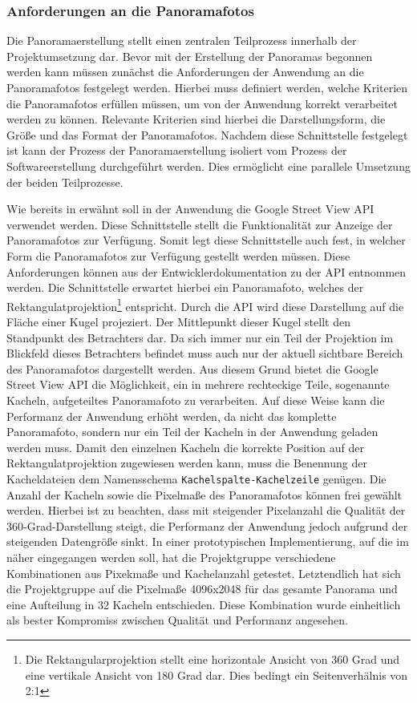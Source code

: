\subsubsection{Anforderungen an die Panoramafotos}
\label{sec:PanoramaerstellungAnforderungen}

Die Panoramaerstellung stellt einen zentralen Teilprozess innerhalb der
Projektumsetzung dar. Bevor mit der Erstellung der Panoramas begonnen werden
kann müssen zunächst die Anforderungen der Anwendung an die Panoramafotos
festgelegt werden. Hierbei muss definiert werden, welche Kriterien die
Panoramafotos erfüllen müssen, um von der Anwendung korrekt verarbeitet werden
zu können. Relevante Kriterien sind hierbei die Darstellungsform, die Größe und
das Format der Panoramafotos. Nachdem diese Schnittstelle festgelegt ist kann
der Prozess der Panoramaerstellung isoliert vom Prozess der Softwareerstellung
durchgeführt werden. Dies ermöglicht eine parallele Umsetzung der beiden
Teilprozesse.

Wie bereits in  erwähnt soll in der Anwendung die Google
Street View API verwendet werden. Diese Schnittstelle stellt die Funktionalität
zur Anzeige der Panoramafotos zur Verfügung. Somit legt diese Schnittstelle auch
fest, in welcher Form die Panoramafotos zur Verfügung gestellt werden müssen.
Diese Anforderungen können aus der Entwicklerdokumentation zu der API entnommen
werden. Die Schnittstelle erwartet hierbei ein Panoramafoto, welches der
Rektangulatprojektion\footnote{Die Rektangularprojektion stellt eine
horizontale Ansicht von 360 Grad und eine vertikale Ansicht von 180 Grad dar.
Dies bedingt ein Seitenverhälnis von 2:1} entspricht. Durch die API wird diese
Darstellung auf die Fläche einer Kugel projeziert. Der Mittlepunkt dieser Kugel
stellt den Standpunkt des Betrachters dar. Da sich immer nur ein Teil der
Projektion im Blickfeld dieses Betrachters befindet muss auch nur der aktuell
sichtbare Bereich des Panoramafotos dargestellt werden. Aus diesem Grund bietet
die Google Street View API die Möglichkeit, ein in mehrere rechteckige Teile,
sogenannte Kacheln, aufgeteiltes Panoramafoto zu verarbeiten. Auf diese Weise
kann die Performanz der Anwendung erhöht werden, da nicht das komplette
Panoramafoto, sondern nur ein Teil der Kacheln in der Anwendung geladen werden
muss. Damit den einzelnen Kacheln die korrekte Position auf der
Rektangulatprojektion zugewiesen werden kann, muss die Benennung der
Kacheldateien dem Namensschema \texttt{Kachelspalte-Kachelzeile} genügen. Die
Anzahl der Kacheln sowie die Pixelmaße des Panoramafotos können frei gewählt
werden. Hierbei ist zu beachten, dass mit steigender Pixelanzahl die Qualität
der 360-Grad-Darstellung steigt, die Performanz der Anwendung jedoch aufgrund
der steigenden Datengröße sinkt. In einer prototypischen Implementierung, auf
die im  näher eingegangen werden soll, hat die
Projektgruppe verschiedene Kombinationen aus Pixekmaße und Kachelanzahl
getestet. Letztendlich hat sich die Projektgruppe auf die Pixelmaße 4096x2048
für das gesamte Panorama und eine Aufteilung in 32 Kacheln entschieden. Diese
Kombination wurde einheitlich als bester Kompromiss zwischen Qualität und
Performanz angesehen.